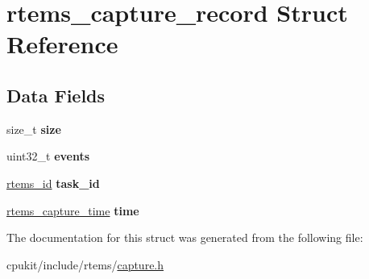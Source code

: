 \hypertarget{structrtems__capture__record}{}\section{rtems\+\_\+capture\+\_\+record Struct Reference}
\label{structrtems__capture__record}
\subsection*{Data Fields}
\begin{DoxyCompactItemize}
\item 
\mbox{\label{structrtems__capture__record_a1c98d5bbe86b989963b1a3e49647d818}} 
size\+\_\+t {\bfseries size}
\item 
\mbox{\label{structrtems__capture__record_a32c99af5b8c3aa2e236b68ed6e07bbb3}} 
uint32\+\_\+t {\bfseries events}
\item 
\mbox{\label{structrtems__capture__record_a9a67a508e6abfe7040449b5534dfd51d}} 
\mbox{\hyperlink{group__ClassicTasks_gab20892b814dced7dd4e5b9bf42becd57}{rtems\+\_\+id}} {\bfseries task\+\_\+id}
\item 
\mbox{\label{structrtems__capture__record_a2255fd4496787affecd808cbcf903bbb}} 
\mbox{\hyperlink{group__libmisc__capture_gaf4cab587ea286bb2352fcfab9c223560}{rtems\+\_\+capture\+\_\+time}} {\bfseries time}
\end{DoxyCompactItemize}


The documentation for this struct was generated from the following file\+:\begin{DoxyCompactItemize}
\item 
cpukit/include/rtems/\mbox{\hyperlink{capture_8h}{capture.\+h}}\end{DoxyCompactItemize}
